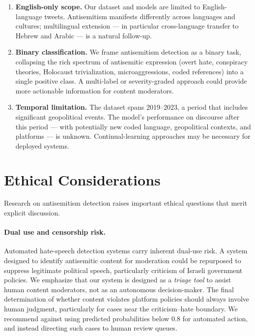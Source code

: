 \documentclass[10pt,a4paper]{article}
\begin{document}
\begin{enumerate}[leftmargin=*,itemsep=3pt]
    \item \textbf{English-only scope.} Our dataset and models are limited to English-language tweets. Antisemitism manifests differently across languages and cultures; multilingual extension --- in particular cross-language transfer to Hebrew and Arabic --- is a natural follow-up.

    \item \textbf{Binary classification.} We frame antisemitism detection as a binary task, collapsing the rich spectrum of antisemitic expression (overt hate, conspiracy theories, Holocaust trivialization, microaggressions, coded references) into a single positive class. A multi-label or severity-graded approach could provide more actionable information for content moderators.

    \item \textbf{Temporal limitation.} The dataset spans 2019--2023, a period that includes significant geopolitical events. The model's performance on discourse after this period --- with potentially new coded language, geopolitical contexts, and platforms --- is unknown. Continual-learning approaches may be necessary for deployed systems.
\end{enumerate}


\section{Ethical Considerations}
\label{sec:ethics}

Research on antisemitism detection raises important ethical questions that merit explicit discussion.

\paragraph{Dual use and censorship risk.}
Automated hate-speech detection systems carry inherent dual-use risk. A system designed to identify antisemitic content for moderation could be repurposed to suppress legitimate political speech, particularly criticism of Israeli government policies. We emphasize that our system is designed as a \emph{triage tool} to assist human content moderators, not as an autonomous decision-maker. The final determination of whether content violates platform policies should always involve human judgment, particularly for cases near the criticism--hate boundary. We recommend against using predicted probabilities below 0.8 for automated action, and instead directing such cases to human review queues.
\end{document}
